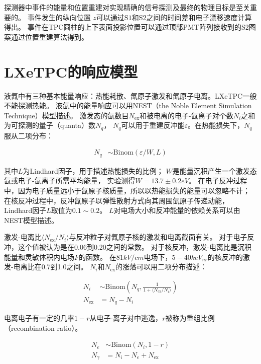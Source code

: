 探测器中事件的能量和位置重建对实现精确的信号探测及最终的物理目标是至关重要的。
事件发生的纵向位置 $z$可以通过$\mathrm{S1}$和$\mathrm{S2}$之间的时间差和电子漂移速度计算得出。
事件在TPC圆柱的上下表面投影位置可以通过顶部PMT阵列接收到的$\mathrm{S2}$图案通过位置重建算法得到。

\section{LXeTPC的响应模型}
\label{sec:basic_response}

液氙中有三种基本能量响应：热能耗散、氙原子激发和氙原子电离。LXeTPC一般不能探测热能。
液氙中的能量响应可以用NEST（the Noble Element Simulation Technique）模型描述\cite{szydagis_nest_2011,lenardo_global_2015}。
激发态的氙数目$N_{\mathrm{ex}}$和被电离的电子-氙离子对个数$N_i$之和为可探测的量子（quanta）数$N_q$，
$N_q$可以用于重建反冲能$\varepsilon $。在热能损失下，$N_q$服从二项分布：

\begin{align}
    \label{eq:N_q}
    N_q &\sim \mathrm{Binom}\left(\varepsilon /W,L\right)
\end{align}

其中$L$为Lindhard因子，用于描述热能损失的比例；
$W$是能量沉积产生一个激发态氙或电子-氙离子所需平均能量，
实验测得$W=13.7\pm0.2\si{eV}$\cite{szydagis_nest_2011}。
在电子反冲过程中，因为电子质量远小于氙原子核质量，所以以热能损失的能量可以忽略不计；
在核反冲过程中，反冲氙原子以弹性散射方式向其周围氙原子传递动能，Lindhard因子$L$取值为$0.1\sim0.2$。
$L$对电场大小和反冲能量的依赖关系可以由NEST模型描述。

激发-电离比$\langle N_{\mathrm{ex}}/N_i\rangle$与反冲粒子对氙原子核的激发和电离截面有关。
对于电子反冲，这个值被认为是在0.06到0.20之间的常数。
对于核反冲，激发-电离比是沉积能量和灵敏体积内电场$F$的函数\cite{lenardo_global_2015}。
在$81\si{kV/cm}$电场下，$5-40\si{keV_{nr}}$的核反冲的激发-电离比在0.7到1.0之间。
$N_i$和$N_{\mathrm{ex}}$的涨落可以用二项分布描述：

\begin{align}
    \label{eq:N_iex}
    N_i &\sim \mathrm{Binom}\left(N_q,\frac{1}{1+\langle N_{\mathrm{ex}}/N_{i}\rangle}\right) \\
    N_{\mathrm{ex}} &= N_q - N_i
\end{align}

电离电子有一定的几率$1-r$从电子-离子对中逃逸，$r$被称为重组比例（\mbox{recombination} ratio）。

\begin{align}
    \label{eq:N_er}
    N_e &\sim \mathrm{Binom}\left(N_i,1-r\right) \\
    N_\gamma &= N_i - N_e + N_{\mathrm{ex}}
\end{align}

